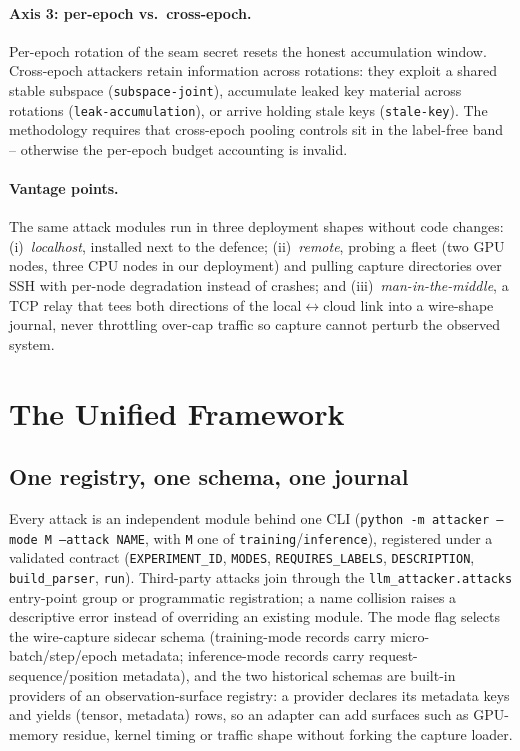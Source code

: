 \documentclass[11pt]{article}
\newcommand{\attack}[1]{\nolinkurl{#1}}
\begin{document}
\paragraph{Axis 3: per-epoch vs.\ cross-epoch.}
Per-epoch rotation of the seam secret resets the honest accumulation
window. Cross-epoch attackers retain information across rotations: they exploit a shared stable
subspace (\attack{subspace-joint}), accumulate leaked key material across
rotations (\attack{leak-accumulation}), or arrive holding stale keys
(\attack{stale-key}). The methodology requires that cross-epoch pooling
controls sit in the label-free band -- otherwise the per-epoch budget
accounting is invalid.

\paragraph{Vantage points.}
The same attack modules run in three deployment shapes without code
changes: (i)~\emph{localhost}, installed next to the defence;
(ii)~\emph{remote}, probing a fleet (two GPU nodes, three CPU nodes in our
deployment) and pulling capture directories over SSH with per-node
degradation instead of crashes; and (iii)~\emph{man-in-the-middle}, a TCP
relay that tees both directions of the local$\leftrightarrow$cloud link
into a wire-shape journal, never throttling over-cap traffic so capture
cannot perturb the observed system.

\section{The Unified Framework}
\label{sec:framework}

\subsection{One registry, one schema, one journal}

Every attack is an independent module behind one CLI
(\texttt{python -m attacker --mode M --attack NAME}, with \texttt{M} one of
\texttt{training}/\texttt{inference}),
registered under a validated contract (\texttt{EXPERIMENT\_ID},
\texttt{MODES}, \texttt{REQUIRES\_LABELS}, \texttt{DESCRIPTION},
\texttt{build\_parser}, \texttt{run}). Third-party attacks join through the
\texttt{llm\_attacker.attacks} entry-point group or programmatic
registration; a name collision raises a descriptive error instead of overriding an
existing module. The mode flag selects the wire-capture sidecar schema
(training-mode records carry micro-batch/step/epoch metadata;
inference-mode records carry request-sequence/position metadata), and the
two historical schemas are built-in providers of an observation-surface
registry: a provider declares its metadata keys and yields
(tensor, metadata) rows, so an adapter can add surfaces such as GPU-memory residue, kernel
timing or traffic shape without forking the capture loader.
\end{document}
